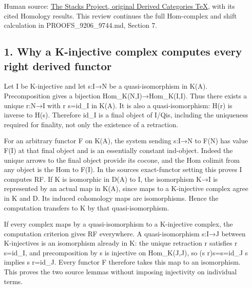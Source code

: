 \documentclass[11pt]{article}
\begin{document}
Human source:\allowbreak{} \href{https://github.com/stacks/stacks-project/blob/a04446e57ec1fbc252a871afcec7752fb2807b14/derived.tex\#L9746}{The Stacks Project,\allowbreak{} original Derived Categories TeX},\allowbreak{} with its cited Homology results. This review continues the full Hom-complex and shift calculation in PROOFS\_\allowbreak{}9206\_\allowbreak{}9744.md,\allowbreak{} Section 7.

\subsection{1. Why a K-injective complex computes every right derived functor}\label{proofs-9746-10132-why-a-k-injective-complex-computes-every-right-derived-functor}

Let I be K-injective and let s:\allowbreak{}I\allowbreak{}→N be a quasi-isomorphism in K(A)\allowbreak{}. Precomposition gives a bijection Hom\_\allowbreak{}K(N,\allowbreak{}I)\allowbreak{}\allowbreak{}→Hom\_\allowbreak{}K(I,\allowbreak{}I)\allowbreak{}. Thus there exists a unique r:\allowbreak{}N\allowbreak{}→I with r s\allowbreak{}=id\_\allowbreak{}I in K(A)\allowbreak{}. It is also a quasi-isomorphism:\allowbreak{} H(r)\allowbreak{} is inverse to H(s)\allowbreak{}. Therefore id\_\allowbreak{}I is a final object of I/\allowbreak{}Qis,\allowbreak{} including the uniqueness required for finality,\allowbreak{} not only the existence of a retraction.

For an arbitrary functor F on K(A)\allowbreak{},\allowbreak{} the system sending s:\allowbreak{}I\allowbreak{}→N to F(N)\allowbreak{} has value F(I)\allowbreak{} at that final object and is an essentially constant ind-object. Indeed the unique arrows to the final object provide its cocone,\allowbreak{} and the Hom colimit from any object is the Hom to F(I)\allowbreak{}. In the source\textquotesingle s exact-functor setting this proves I computes RF. If K is isomorphic in D(A)\allowbreak{} to I,\allowbreak{} the isomorphism K\allowbreak{}→I is represented by an actual map in K(A)\allowbreak{},\allowbreak{} since maps to a K-injective complex agree in K and D. Its induced cohomology maps are isomorphisms. Hence the computation transfers to K by that quasi-isomorphism.

If every complex maps by a quasi-isomorphism to a K-injective complex,\allowbreak{} the computation criterion gives RF everywhere. A quasi-isomorphism s:\allowbreak{}I\allowbreak{}→J between K-injectives is an isomorphism already in K:\allowbreak{} the unique retraction r satisfies r s\allowbreak{}=id\_\allowbreak{}I,\allowbreak{} and precomposition by s is injective on Hom\_\allowbreak{}K(J,\allowbreak{}J)\allowbreak{},\allowbreak{} so (s r)\allowbreak{}s\allowbreak{}=s\allowbreak{}=id\_\allowbreak{}J s implies s r\allowbreak{}=id\_\allowbreak{}J. Every functor F therefore takes this map to an isomorphism. This proves the two source lemmas without imposing injectivity on individual terms.
\end{document}
